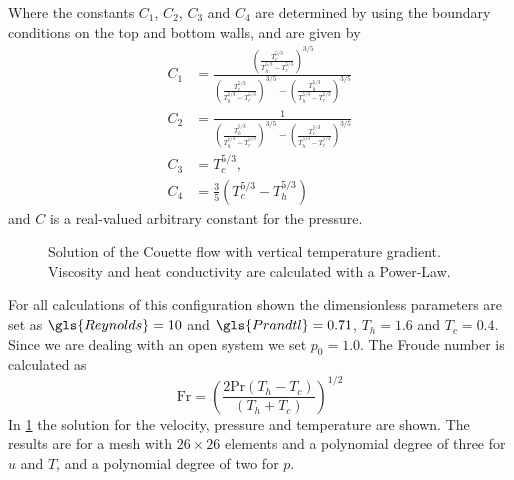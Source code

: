 Where the constants $C_1$, $C_2$, $C_3$ and $C_4$ are determined by using the boundary conditions on the top and bottom walls, and are given by
\begin{align}
	C_1 & = \frac{\left(\frac{T_c^{5/3}}{T_h^{5/3}-T_c^{5/3}}\right)^{3/5}}{\left(\frac{T_c^{5/3}}{T_h^{5/3}-T_c^{5/3}}\right)^{3/5}-\left(\frac{T_h^{5/3}}{T_h^{5/3}-T_c^{5/3}}\right)^{3/5}} \\
	C_2 & = \frac{1}{\left(\frac{T_h^{5/3}}{T_h^{5/3}-T_c^{5/3}}\right)^{3/5}-\left(\frac{T_c^{5/3}}{T_h^{5/3}-T_c^{5/3}}\right)^{3/5}}                                                        \\
	C_3 & = T_c^{5/3},                                                                                                                                                                         \\
	C_4 & = \frac{3}{5}\left(T_c^{5/3}-T_h^{5/3}\right)
\end{align}
and $C$ is a real-valued arbitrary constant for the pressure.%
\begin{center}
	\begin{figure}[tb]
		\pgfplotsset{
			group/xticklabels at=edge bottom,
		}
		\caption{Solution of the Couette flow with vertical temperature gradient. Viscosity and heat conductivity are calculated with a Power-Law.}
		\label{fig:CouetteSolution}
	\end{figure}
\end{center}
\FloatBarrier
For all calculations of this configuration shown the dimensionless parameters are set as $\gls{Reynolds} = 10$ and $\gls{Prandtl} =0.71$, $T_h = 1.6$ and $T_c = 0.4$. Since we are dealing with an open system we set $p_0 =1.0$. The Froude number is calculated as
\begin{equation}
	\text{Fr} = \left( \frac{2\text{Pr}(T_h-T_c)}{(T_h+T_c)}\right)^{1/2}
\end{equation}
In \cref{fig:CouetteSolution} the solution for the velocity, pressure and temperature are shown. The results are for a mesh with $26\times26$ elements and a polynomial degree of three for $u$ and $T$, and a polynomial degree of two for $p$.
